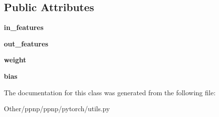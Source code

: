 \subsection*{Public Attributes}
\begin{DoxyCompactItemize}
\item 
\mbox{\label{classppnp_1_1pytorch_1_1utils_1_1MixedLinear_a8c35e640679ffa35072c745ce86e8d29}} 
{\bfseries in\+\_\+features}
\item 
\mbox{\label{classppnp_1_1pytorch_1_1utils_1_1MixedLinear_a80fe6b673bf34f321d84e7b837c98887}} 
{\bfseries out\+\_\+features}
\item 
\mbox{\label{classppnp_1_1pytorch_1_1utils_1_1MixedLinear_a154b73e67bf62c75c8c562164c6cbb28}} 
{\bfseries weight}
\item 
\mbox{\label{classppnp_1_1pytorch_1_1utils_1_1MixedLinear_a9a808627df8d87f0b3e55581ad053faf}} 
{\bfseries bias}
\end{DoxyCompactItemize}


The documentation for this class was generated from the following file\+:\begin{DoxyCompactItemize}
\item 
Other/ppnp/ppnp/pytorch/utils.\+py\end{DoxyCompactItemize}
